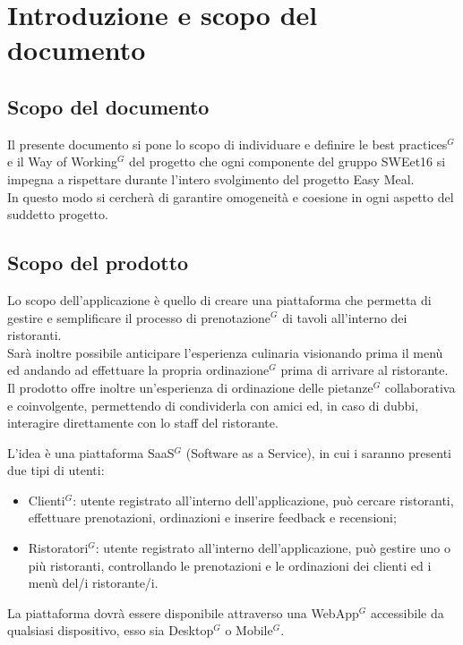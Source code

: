 \section{Introduzione e scopo del documento}

    \subsection{Scopo del documento}

    Il presente documento si pone lo scopo di individuare e definire le best practices$^{G}$ e il Way of Working$^{G}$ del progetto che ogni componente del gruppo SWEet16
    si impegna a rispettare durante l’intero svolgimento del progetto Easy Meal. \\
    In questo modo si cercherà di garantire omogeneità e coesione in ogni aspetto del suddetto progetto.
  
    \subsection{Scopo del prodotto}

    Lo scopo dell’applicazione è quello di creare una piattaforma che permetta di gestire e semplificare il processo di prenotazione$^{G}$ di tavoli all’interno dei ristoranti. \\
    Sarà inoltre possibile anticipare l’esperienza culinaria visionando prima il menù ed andando ad effettuare la propria ordinazione$^{G}$ prima di arrivare al ristorante. \\
    Il prodotto offre inoltre un’esperienza di ordinazione delle pietanze$^{G}$ collaborativa e coinvolgente, permettendo di condividerla con amici ed, in caso di dubbi, interagire direttamente con lo staff del ristorante.

    L’idea è una piattaforma SaaS$^{G}$ (Software as a Service), in cui i saranno presenti due tipi di utenti:
    \begin{itemize}
        \item Clienti$^{G}$: utente registrato all’interno dell’applicazione, può cercare ristoranti, effettuare prenotazioni, ordinazioni e inserire feedback e recensioni;
        \item Ristoratori$^{G}$: utente registrato all’interno dell’applicazione, può gestire uno o più ristoranti, controllando le prenotazioni e le ordinazioni dei clienti ed i menù del/i ristorante/i.
    \end{itemize}


    La piattaforma dovrà essere  disponibile attraverso una WebApp$^{G}$ accessibile da qualsiasi dispositivo, esso sia Desktop$^{G}$ o Mobile$^{G}$.
    

